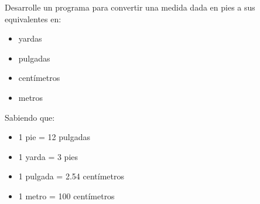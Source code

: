 Desarrolle un programa para convertir una medida dada en pies a sus equivalentes en:
\begin{itemize}
	\item yardas
	\item pulgadas
	\item centímetros
	\item metros
\end{itemize}

Sabiendo que:

\begin{itemize}
\item 1 pie = 12 pulgadas
\item 1 yarda = 3 pies
\item 1 pulgada = 2.54 centímetros
\item 1 metro = 100 centímetros
\end{itemize}
